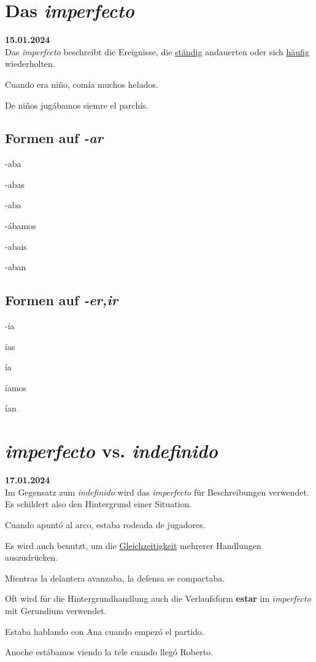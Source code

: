 \section{Das \textit{imperfecto}}
\textbf{15.01.2024}\\
Das \textit{imperfecto} beschreibt die Ereignisse, die 
\underline{ständig} andauerten oder sich \underline{häufig}
wiederholten.
\begin{ejemplos}
    \item Cuando era ni\~no, com\'ia muchos helados.
    \item De ni\~nos jug\'abamos siemre el parch\'is.
\end{ejemplos}
\subsection*{Formen auf \textit{-ar}}
\begin{gramatica}
    \item -aba
    \item -abas
    \item -aba
    \item -\'abamos 
    \item -abais
    \item -aban
\end{gramatica}
\subsection*{Formen auf \textit{-er,ir}}
\begin{gramatica}
    \item -\'ia
    \item \'ias 
    \item \'ia 
    \item \'iamos 
    \item \'ian
\end{gramatica}
\section{\textit{imperfecto} vs. \textit{indefinido}}
\textbf{17.01.2024}\\
Im Gegensatz zum \textit{indefinido} wird das \textit{imperfecto}
für Beschreibungen verwendet. Es schildert also den Hintergrund einer 
Situation.
\begin{ejemplos}
    \item Cuando apunt\'o al arco, estaba rodeada de jugadores.
\end{ejemplos}
Es wird auch benutzt, um die \underline{Gleichzeitigkeit} mehrerer 
Handlungen auszudrücken.
\begin{ejemplos}
    \item Mientras la delantera avanzaba, la defensa se compactaba.
\end{ejemplos}
Oft wird für die Hintergrundhandlung auch die Verlaufsform \textbf{estar} 
im \textit{imperfecto} mit Gerundium verwendet.
\begin{ejemplos}
    \item Estaba hablando con Ana cuando empez\'o el partido.
    \item Anoche est\'abamos viendo la tele cuando lleg\'o Roberto.
\end{ejemplos}
